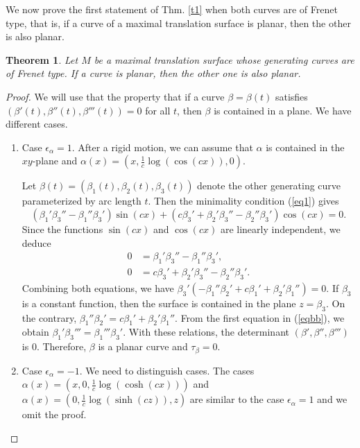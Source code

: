 \documentclass[a4paper,12pt]{amsart}
\numberwithin{equation}{section}
\newtheorem{theorem}{Theorem}[section]
\theoremstyle{definition}
\begin{document}
We now prove the first statement of Thm. \ref{t1} when both curves are of Frenet type, that is, if a curve of a maximal translation surface is planar, then the other is also planar. 

\begin{theorem}\label{t43} 
Let $M$ be a maximal translation surface whose generating curves are of Frenet type.  If a curve is planar, then the other one is also planar.
\end{theorem}

\begin{proof} We will use that the property that if a curve $\beta=\beta(t)$ satisfies $(\beta'(t), \beta''(t),\beta'''(t))=0$ for all $t$, then $\beta$ is contained in a plane.  We have different cases.
\begin{enumerate}
\item Case $\epsilon_\alpha=1$.  After a rigid motion, we can assume that $\alpha$ is contained in the $xy$-plane and  $\alpha(x)=(x,\frac{1}{c}\log(\cos (c x)),0)$.

 

 Let   $\beta(t)=(\beta_1(t),\beta_2(t),\beta_3(t))$ denote the  other generating curve   parameterized by arc length $t$. Then  the minimality condition (\ref{eq1}) gives
$$(\beta_1'\beta_3''-\beta_1''\beta_3')\sin(cx)+(c\beta_3'+\beta_2'\beta_3''-\beta_2''\beta_3')\cos(cx)=0.$$
Since the functions $\sin(cx)$ and $\cos(cx)$ are linearly independent, we deduce
\begin{equation}\label{eqbb}
\begin{split}
0&=\beta_1'\beta_3''-\beta_1''\beta_3',\\
0&= c\beta_3'+\beta_2'\beta_3''-\beta_2''\beta_3'.
\end{split}
\end{equation}
Combining both equations, we have $\beta_3'(-\beta_1''\beta_2'+c\beta_1'+\beta_2'\beta_1'')=0$. If $\beta_3$ is a constant function, then the surface is contained in the plane $z=\beta_3$.  On the contrary, $\beta_1''\beta_2'=c\beta_1'+\beta_2'\beta_1''$. From the first equation in (\ref{eqbb}), we obtain $\beta_1'\beta_3'''=\beta_1'''\beta_3'$. With these relations,    the determinant  $(\beta',\beta'',\beta''')$ is $0$. Therefore, $\beta$ is a planar curve and  $\tau_\beta=0$.

\item Case $\epsilon_\alpha=-1$.  We need to distinguish cases. The cases $\alpha(x)=(x,0,\frac{1}{c}\log(\cosh(cx)))$ and  $\alpha(x)=(0,\frac{1}{c}\log(\sinh(cz)),z)$ are similar to the case $\epsilon_\alpha=1$ and we omit the proof. 


\end{enumerate}
\end{proof}
\end{document}
